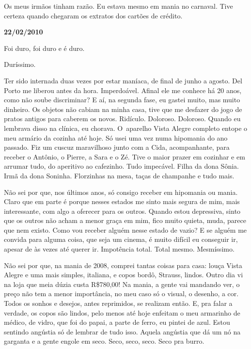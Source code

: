 Os meus irmãos tinham razão. Eu estava mesmo em mania no carnaval. Tive
certeza quando chegaram os extratos dos cartões de crédito.

\begin{center}\textbf{\asterisc{}}\end{center}


\textbf{}

\begin{flushright}\textbf{22/02/2010}\end{flushright}


Foi duro, foi duro e é duro.

Duríssimo.

Ter sido internada duas vezes por estar maníaca, de final de junho a
agosto. Del Porto me liberou antes da hora. Imperdoável. Afinal ele me
conhece há 20 anos, como não soube discriminar? E aí, na segunda fase,
eu gastei muito, mas muito dinheiro. Os objetos não cabiam na minha
casa, tive que me desfazer do jogo de pratos antigos para caberem os
novos. Ridículo. Doloroso. Doloroso. Quando eu lembrava disso na
clínica, eu chorava. O~aparelho Vista Alegre completo entope o meu
armário da cozinha até hoje. Só usei uma vez numa hipomania do ano
passado. Fiz um cuscuz maravilhoso junto com a Cida, acompanhante, para
receber o Antônio, o Pierre, a Sara e o Zé. Tive o maior prazer em
cozinhar e em arrumar tudo, do aperitivo ao cafezinho. Tudo impecável.
Filha da dona Sônia. Irmã da dona Soninha. Florzinhas na mesa, taças de
champanhe e tudo mais.

Não sei por que, nos últimos anos, só consigo receber em hipomania ou
mania. Claro que em parte é porque nesses estados me sinto mais segura
de mim, mais interessante, com algo a oferecer para os outros. Quando
estou depressiva, sinto que os outros não acham a menor graça em mim,
fico muito quieta, muda, parece que nem existo. Como vou receber alguém
nesse estado de vazio? E se alguém me convida para alguma coisa, que
seja um cinema, é muito difícil eu conseguir ir, apesar de às vezes até
querer ir. Impotência total. Total mesmo. Mesmíssimo.

Não sei por que, na mania de 2008, comprei tantas coisas para casa:
louça Vista Alegre e uma mais simples, italiana, e copos bordô, Strauss,
lindos. Outro dia vi na loja que meia dúzia custa R\$780,00! Na mania, a
gente vai mandando ver, o preço não tem a menor importância, no meu caso
só o visual, o desenho, a cor. Todos os sonhos e desejos, antes
reprimidos, se realizam então. E, pra falar a verdade, os copos são
lindos, pelo menos até hoje enfeitam o meu armarinho de médico, de
vidro, que foi do papai, a parte de ferro, eu pintei de azul. Estou
sentindo angústia só de lembrar de tudo isso. Aquela angústia que dá um
nó na garganta e a gente engole em seco. Seco, seco, seco. Seco pra
burro.

